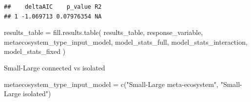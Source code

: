 \documentclass[
]{article}
\newenvironment{Shaded}{\begin{snugshade}}{\end{snugshade}}
\newcommand{\FunctionTok}[1]{\textcolor[rgb]{0.00,0.00,0.00}{#1}}
\newcommand{\NormalTok}[1]{#1}
\newcommand{\OtherTok}[1]{\textcolor[rgb]{0.56,0.35,0.01}{#1}}
\newcommand{\StringTok}[1]{\textcolor[rgb]{0.31,0.60,0.02}{#1}}
\begin{document}
\begin{verbatim}
##    deltaAIC    p_value R2
## 1 -1.069713 0.07976354 NA
\end{verbatim}

\begin{Shaded}
\begin{Highlighting}[]
\NormalTok{results\_table }\OtherTok{=} \FunctionTok{fill.results.table}\NormalTok{(}
\NormalTok{  results\_table,}
\NormalTok{  response\_variable,}
\NormalTok{  metaecosystem\_type\_input\_model,}
\NormalTok{  model\_stats\_full,}
\NormalTok{  model\_stats\_interaction,}
\NormalTok{  model\_stats\_fixed}
\NormalTok{)}
\end{Highlighting}
\end{Shaded}

Small-Large connected vs isolated

\begin{Shaded}
\begin{Highlighting}[]
\NormalTok{metaecosystem\_type\_input\_model }\OtherTok{=} \FunctionTok{c}\NormalTok{(}\StringTok{"Small{-}Large meta{-}ecosystem"}\NormalTok{,}
                                   \StringTok{"Small{-}Large isolated"}\NormalTok{)}
\end{Highlighting}
\end{Shaded}
\end{document}

